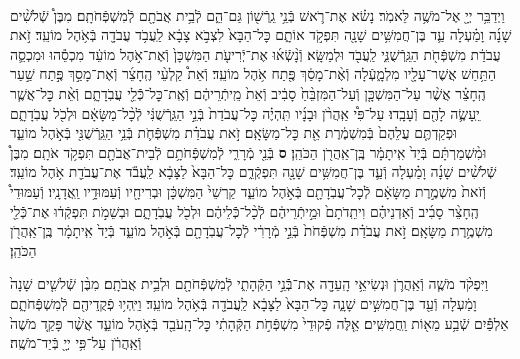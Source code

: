 \documentclass[twoside, openany, parskip=half, 11pt]{book}
\begin{document}
\begin{sometimes}
\begin{footnotesize}
\begin{multicols}{2}
\\
וַיְדַבֵּ֥ר יְיָ֖ אֶל־מֹשֶׁ֥ה לֵּאמֹֽר׃ נָשׂ֗א אֶת־רֹ֛אשׁ בְּֿנֵ֥י גֵֽרְֿשׁ֖וֹן גַּם־הֵ֑ם לְֿבֵ֥ית אֲבֹתָ֖ם לְֿמִשְׁפְּֿחֹתָֽם׃ מִבֶּן֩ שְֿׁלֹשִׁ֨ים שָׁנָ֜ה וָמַ֗עְלָה עַ֛ד בֶּן־חֲמִשִּׁ֥ים שָׁנָ֖ה תִּפְקֹ֣ד אוֹתָ֑ם כׇּל־הַבָּא֙ לִצְבֹ֣א צָבָ֔א לַֽעֲבֹ֥ד עֲבֹדָ֖ה בְּֿאֹ֥הֶל מוֹעֵֽד׃ זֹ֣את עֲבֹדַ֔ת מִשְׁפְּֿחֹ֖ת הַגֵּֽרְֿשֻׁנִּ֑י לַֽעֲבֹ֖ד וּלְמַשָּֽׂא׃  וְֿנָ֨שְֿׂא֜וּ אֶת־יְֿרִיעֹ֤ת הַמִּשְׁכָּן֙ וְֿאֶת־אֹ֣הֶל מוֹעֵ֔ד מִכְסֵ֕הוּ וּמִכְסֵ֛ה הַתַּ֥חַשׁ אֲשֶׁר־עָלָ֖יו מִלְמָ֑עְֿלָה וְֿאֶ֨ת־מָסַ֔ךְ פֶּ֖תַח אֹ֥הֶל מוֹעֵֽד׃ וְֿאֵת֩ קַלְעֵ֨י הֶֽחָצֵ֜ר וְֿאֶת־מָסַ֣ךְ פֶּ֣תַח שַׁ֣עַר הֶֽחָצֵ֗ר אֲשֶׁ֨ר עַל־הַמִּשְׁכָּ֤ן וְֿעַל־הַמִּזְבֵּ֨חַ֙ סָבִ֔יב וְֿאֵת֙ מֵֽיתְֿרֵיהֶ֔ם וְֿאֶֽת־כׇּל־כְּֿֿלֵ֖י עֲבֹֽדָתָ֑ם וְֿאֵ֨ת כׇּל־אֲשֶׁ֧ר יֵֽעָשֶׂ֛ה לָהֶ֖ם וְֿעָבָֽדוּ׃ עַל־פִּ֩י אַֽהֲרֹ֨ן וּבָנָ֜יו תִּֽהְיֶ֗ה כׇּל־עֲבֹדַת֙ בְּֿנֵ֣י הַגֵּֽרְֿשֻׁנִּ֔י לְֿכָ֨ל־מַשָּׂאָ֔ם וּלְכֹ֖ל עֲבֹֽדָתָ֑ם וּפְקַדְתֶּ֤ם עֲלֵהֶם֙ בְּֿמִשְׁמֶ֔רֶת אֵ֖ת כׇּל־מַשָּׂאָֽם׃ זֹ֣את עֲבֹדַ֗ת מִשְׁפְּֿחֹ֛ת בְּֿנֵ֥י הַגֵּֽרְֿשֻׁנִּ֖י בְּֿאֹ֣הֶל מוֹעֵ֑ד וּמִ֨שְׁמַרְתָּ֔ם בְּֿיַד֙ אִֽיתָמָ֔ר בֶּֽן־אַֽהֲרֹ֖ן הַכֹּהֵֽן׃ \textbf{ס}  בְּֿנֵ֖י מְֿרָרִ֑י לְֿמִשְׁפְּֿחֹתָ֥ם לְֿבֵית־אֲבֹתָ֖ם תִּפְקֹ֥ד אֹתָֽם׃ מִבֶּן֩ שְֿׁלֹשִׁ֨ים שָׁנָ֜ה וָמַ֗עְלָה וְֿעַ֛ד בֶּן־חֲמִשִּׁ֥ים שָׁנָ֖ה תִּפְקְֿדֵ֑ם כׇּל־הַבָּא֙ לַצָּבָ֔א לַֽעֲבֹ֕ד אֶת־עֲבֹדַ֖ת אֹ֥הֶל מוֹעֵֽד׃ וְֿזֹאת֙ מִשְׁמֶ֣רֶת מַשָּׂאָ֔ם לְֿכׇל־עֲבֹֽדָתָ֖ם בְּֿאֹ֣הֶל מוֹעֵ֑ד קַרְשֵׁי֙ הַמִּשְׁכָּ֔ן וּבְרִיחָ֖יו וְֿעַמּוּדָ֥יו וַֽאֲדָנָֽיו׃ וְֿעַמּוּדֵי֩ הֶֽחָצֵ֨ר סָבִ֜יב וְֿאַדְנֵיהֶ֗ם וִיתֵֽדֹתָם֙ וּמֵ֣יתְֿרֵיהֶ֔ם לְֿכָ֨ל־כְּֿֿלֵיהֶ֔ם וּלְכֹ֖ל עֲבֹֽדָתָ֑ם וּבְשֵׁמֹ֣ת תִּפְקְֿד֔וּ אֶת־כְּֿֿלֵ֖י מִשְׁמֶ֥רֶת מַשָּׂאָֽם׃ זֹ֣את עֲבֹדַ֗ת מִשְׁפְּֿחֹת֙ בְּֿנֵ֣י מְֿרָרִ֔י לְֿכׇל־עֲבֹֽדָתָ֖ם בְּֿאֹ֣הֶל מוֹעֵ֑ד בְּֿיַד֙ אִֽיתָמָ֔ר בֶּֽן־אַֽהֲרֹ֖ן הַכֹּהֵֽן׃


וַיִּפְקֹ֨ד מֹשֶׁ֧ה וְֿאַֽהֲרֹ֛ן וּנְשִׂיאֵ֥י הָֽעֵדָ֖ה אֶת־בְּֿֿנֵ֣י הַקְּֿהָתִ֑י לְֿמִשְׁפְּֿחֹתָ֖ם וּלְבֵ֥ית אֲבֹתָֽם׃ מִבֶּ֨ן שְֿׁלשִׁ֤ים שָׁנָה֙ וָמַ֔עְלָה וְֿעַ֖ד בֶּן־חֲמִשִּׁ֣ים שָׁנָ֑ה כׇּל־הַבָּא֙ לַצָּבָ֔א לַֽעֲבֹדָ֖ה בְּֿאֹ֥הֶל מוֹעֵֽד׃ וַיִּֽהְי֥וּ פְֿקֻֽדֵיהֶ֖ם לְֿמִשְׁפְּֿחֹתָ֑ם אַלְפַּ֕יִם שְֿׁבַ֥ע מֵא֖וֹת וַֽחֲמִשִּֽׁים׃ אֵ֤לֶּה פְֿקוּדֵי֙ מִשְׁפְּֿחֹ֣ת הַקְּֿהָתִ֔י כׇּל־הָֽעֹבֵ֖ד בְּֿאֹ֣הֶל מוֹעֵ֑ד אֲשֶׁ֨ר פָּקַ֤ד מֹשֶׁה֙ וְֿאַֽהֲרֹ֔ן עַל־פִּ֥י יְיָ֖ בְּֿיַד־מֹשֶֽׁה׃



\end{multicols}
\end{footnotesize}
\end{sometimes}
\end{document}
